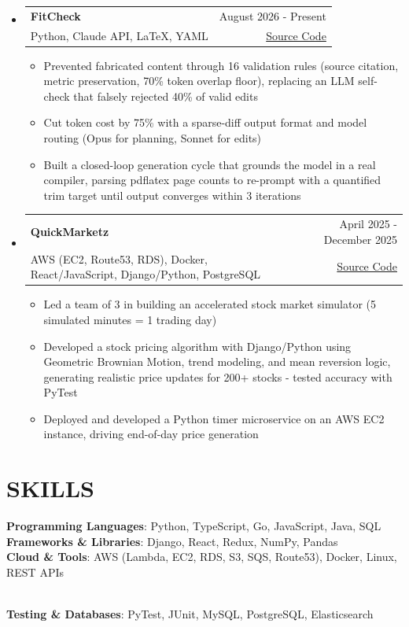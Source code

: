 \documentclass[letterpaper,11pt]{article}
\makeatletter
\newcommand{\resumeItem}[1]{
  \item\small{
    {#1 \vspace{-2pt}}
  }
}
\newcommand{\resumeProjectHeading}[4]{
  \vspace{-2pt}\item
    \begin{tabular*}{1\textwidth}[t]{l@{\extracolsep{\fill}}r}
      \textbf{#1} & #2 \\
      {\small#3} & {\small #4} \\
    \end{tabular*}\vspace{-7pt}
}
\newcommand{\resumeSubHeadingListStart}{\begin{itemize}[leftmargin=0in, label={}]}
\newcommand{\resumeSubHeadingListEnd}{\end{itemize}}
\newcommand{\resumeItemListStart}{\begin{itemize}}
\newcommand{\resumeItemListEnd}{\end{itemize}\vspace{-4pt}}
\makeatother
\begin{document}
  \resumeSubHeadingListStart
    \resumeProjectHeading
      {FitCheck}
      {August 2026 - Present}
      {Python, Claude API, LaTeX, YAML}
      {\href{https://github.com/MichaelAho1/Resume_Tailorer}{Source Code}}
      \resumeItemListStart
        \resumeItem{Prevented fabricated content through 16 validation rules (source citation, metric preservation, 70\% token overlap floor), replacing an LLM self-check that falsely rejected 40\% of valid edits}
        \resumeItem{Cut token cost by 75\% with a sparse-diff output format and model routing (Opus for planning, Sonnet for edits)}
        \resumeItem{Built a closed-loop generation cycle that grounds the model in a real compiler, parsing pdflatex page counts to re-prompt with a quantified trim target until output converges within 3 iterations}
      \resumeItemListEnd
    \resumeProjectHeading
      {QuickMarketz}
      {April 2025 - December 2025}
      {AWS (EC2, Route53, RDS), Docker, React/JavaScript, Django/Python, PostgreSQL}
      {\href{https://github.com/MichaelAho1/QuickMarkets}{Source Code}}
      \resumeItemListStart
        \resumeItem{Led a team of 3 in building an accelerated stock market simulator  (5 simulated minutes = 1 trading day)}
        \resumeItem{Developed a stock pricing algorithm with Django/Python using Geometric Brownian Motion, trend modeling, and mean reversion logic, generating realistic price updates for 200+ stocks - tested accuracy with PyTest}
        \resumeItem{Deployed and developed a Python timer microservice on an AWS EC2 instance, driving end-of-day price generation}
      \resumeItemListEnd
    \resumeSubHeadingListEnd

\section{SKILLS}
 \begin{itemize}[leftmargin=0in, label={}]
    \small{\item{
     \textbf{Programming Languages}{: Python, TypeScript, Go, JavaScript, Java, SQL} \\
     \textbf{Frameworks \& Libraries}{: Django, React, Redux, NumPy, Pandas} \\
    \textbf{Cloud \& Tools}{: AWS (Lambda, EC2, RDS, S3, SQS, Route53), Docker, Linux, REST APIs} }} \\
    \textbf{Testing \& Databases}{: PyTest, JUnit, MySQL, PostgreSQL, Elasticsearch} 
 \end{itemize}
\end{document}
